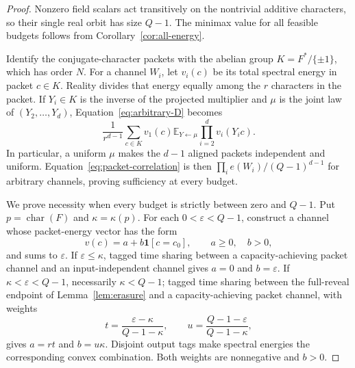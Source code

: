 \documentclass[11pt]{article}
\theoremstyle{definition}
\newcommand{\E}{\mathbb{E}}
\begin{document}
\begin{proof}
Nonzero field scalars act transitively on the nontrivial additive characters,
so their single real orbit has size $Q-1$.  The minimax value for all feasible
budgets follows from Corollary~\ref{cor:all-energy}.

Identify the conjugate-character packets with the abelian group
$K=F^*/\{\pm1\}$, which has order $N$.  For a channel $W_i$, let
$v_i(c)$ be its total spectral energy in packet $c\in K$.  Reality divides that
energy equally among the $r$ characters in the packet.  If
$Y_i\in K$ is the inverse of the projected multiplier and $\mu$ is the joint
law of $(Y_2,\ldots,Y_d)$, Equation~\eqref{eq:arbitrary-D} becomes
\begin{equation}\label{eq:packet-correlation}
 \frac{1}{r^{d-1}}\sum_{c\in K}v_1(c)
   \E_{Y\leftarrow\mu}\prod_{i=2}^d v_i(Y_i c).
\end{equation}
In particular, a uniform $\mu$ makes the $d-1$ aligned packets independent and
uniform.  Equation~\eqref{eq:packet-correlation} is then
$\prod_i e(W_i)/(Q-1)^{d-1}$ for arbitrary channels, proving sufficiency at
every budget.

We prove necessity when every budget is strictly between zero and $Q-1$.  Put
$p=\operatorname{char}(F)$ and $\kappa=\kappa(p)$.  For each
$0<\varepsilon<Q-1$, construct a channel whose packet-energy vector has the
form
\begin{equation}\label{eq:spiked-packet-vector}
 v(c)=a+b\mathbf1[c=c_0],\qquad a\geq0,\quad b>0,
\end{equation}
and sums to $\varepsilon$.  If $\varepsilon\leq\kappa$, tagged time sharing
between a capacity-achieving packet channel and an input-independent channel
gives $a=0$ and $b=\varepsilon$.  If
$\kappa<\varepsilon<Q-1$, necessarily $\kappa<Q-1$; tagged time sharing
between the full-reveal endpoint of Lemma~\ref{lem:erasure} and a
capacity-achieving packet channel, with weights
\[
 t=\frac{\varepsilon-\kappa}{Q-1-\kappa},\qquad
 u=\frac{Q-1-\varepsilon}{Q-1-\kappa},
\]
gives $a=rt$ and $b=u\kappa$.  Disjoint output tags make spectral energies the
corresponding convex combination.  Both weights are nonnegative and $b>0$.


\end{proof}
\end{document}

